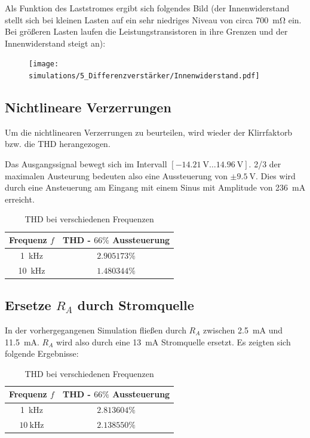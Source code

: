 Als Funktion des Laststromes ergibt sich folgendes Bild (der Innenwiderstand stellt sich bei kleinen Lasten auf ein sehr niedriges Niveau von circa \SI{700}{\milli \ohm} ein. Bei größeren Lasten laufen die Leistungstransistoren in ihre Grenzen und der Innenwiderstand steigt an):

\begin{figure}[H]
    \centering
    \texttt{[image: simulations/5\_Differenzverstärker/Innenwiderstand.pdf]}
    \label{fig:my_label}
\end{figure}

\subsection{Nichtlineare Verzerrungen}

Um die nichtlinearen Verzerrungen zu beurteilen, wird wieder der Klirrfaktorb bzw. die THD herangezogen.

Das Ausgangssignal bewegt sich im Intervall $\left[\SI{-14.21}{\volt} \ldots \SI{14.96}{\volt} \right]$. 2/3 der maximalen Austeurung bedeuten also eine Aussteuerung von $\pm\SI{9.5}{\volt}$. Dies wird durch eine Ansteuerung am Eingang mit einem Sinus mit Amplitude von \SI{236}{\milli \ampere} erreicht.

\begin{table}[H]
    \centering
    \begin{tabular}{|c||c|} \hline
         {Frequenz $f$} & {THD - $66\%$ Aussteuerung} \\ \hline \hline
         \SI{1}{\kilo \hertz}& $2.905173\%$  \\ \hline
         \SI{10}{\kilo \hertz}& $1.480344\%$  \\ \hline
    \end{tabular}
    \caption{THD bei verschiedenen Frequenzen}
    \label{tab:my_label}
\end{table}

\subsection{Ersetze $R_A$ durch Stromquelle}

In der vorhergegangenen Simulation fließen durch $R_A$ zwischen \SI{2.5}{\milli \ampere} und \SI{11.5}{\milli \ampere}. $R_A$ wird also durch eine \SI{13}{\milli \ampere} Stromquelle ersetzt. Es zeigten sich folgende Ergebnisse:

\begin{table}[H]
    \centering
    \begin{tabular}{|c||c|} \hline
         {Frequenz $f$} & {THD - $66\%$ Aussteuerung} \\ \hline \hline
         \SI{1}{\kilo \hertz}& $2.813604\%$  \\ \hline
         $\SI{10}{\kilo \hertz}$& $2.138550\%$  \\ \hline
    \end{tabular}
    \caption{THD bei verschiedenen Frequenzen}
    \label{tab:my_label}
\end{table}

